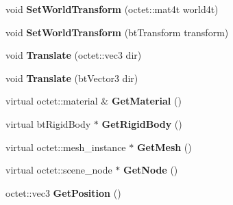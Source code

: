 \begin{DoxyCompactItemize}
\item 
\hypertarget{class_arena_1_1_physics_object_ab3f025024f294f67913cd06c2ee0116a}{void {\bfseries Set\+World\+Transform} (octet\+::mat4t world4t)}\label{class_arena_1_1_physics_object_ab3f025024f294f67913cd06c2ee0116a}

\item 
\hypertarget{class_arena_1_1_physics_object_a69f91c2a392a5ace0af86d69d355f5ee}{void {\bfseries Set\+World\+Transform} (bt\+Transform transform)}\label{class_arena_1_1_physics_object_a69f91c2a392a5ace0af86d69d355f5ee}

\item 
\hypertarget{class_arena_1_1_physics_object_a93fc76dcb805562b0a52bfd2cf5875fc}{void {\bfseries Translate} (octet\+::vec3 dir)}\label{class_arena_1_1_physics_object_a93fc76dcb805562b0a52bfd2cf5875fc}

\item 
\hypertarget{class_arena_1_1_physics_object_a0f087630aa3ec68b5038c14e65ead3c5}{void {\bfseries Translate} (bt\+Vector3 dir)}\label{class_arena_1_1_physics_object_a0f087630aa3ec68b5038c14e65ead3c5}

\item 
\hypertarget{class_arena_1_1_physics_object_a6f3c3b01b933d19be331473e83f50792}{virtual octet\+::material \& {\bfseries Get\+Material} ()}\label{class_arena_1_1_physics_object_a6f3c3b01b933d19be331473e83f50792}

\item 
\hypertarget{class_arena_1_1_physics_object_a9b8197cee988ddfd57be2fd86d5ee404}{virtual bt\+Rigid\+Body $\ast$ {\bfseries Get\+Rigid\+Body} ()}\label{class_arena_1_1_physics_object_a9b8197cee988ddfd57be2fd86d5ee404}

\item 
\hypertarget{class_arena_1_1_physics_object_a5d7d933148997b6a48511e5650b46c49}{virtual octet\+::mesh\+\_\+instance $\ast$ {\bfseries Get\+Mesh} ()}\label{class_arena_1_1_physics_object_a5d7d933148997b6a48511e5650b46c49}

\item 
\hypertarget{class_arena_1_1_physics_object_a0e18b08f240a130fdc6aad588fcac72d}{virtual octet\+::scene\+\_\+node $\ast$ {\bfseries Get\+Node} ()}\label{class_arena_1_1_physics_object_a0e18b08f240a130fdc6aad588fcac72d}

\item 
\hypertarget{class_arena_1_1_physics_object_a8dbe1238d40acc779ba9ad599ffab09e}{octet\+::vec3 {\bfseries Get\+Position} ()}\label{class_arena_1_1_physics_object_a8dbe1238d40acc779ba9ad599ffab09e}

\end{DoxyCompactItemize}
